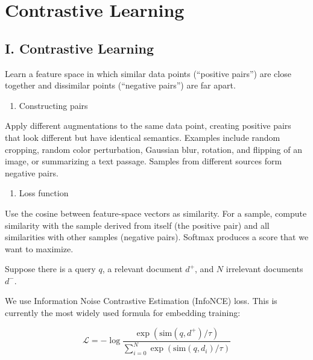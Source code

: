 \setcounter{section}{0}

\hypertarget{contrastive-learning}{%
\section{Contrastive Learning}\label{contrastive-learning}}

\hypertarget{i.-contrastive-learning}{%
\subsection{I. Contrastive Learning}\label{i.-contrastive-learning}}

Learn a feature space in which similar data points (``positive pairs'') are close together and dissimilar points (``negative pairs'') are far apart.

\begin{enumerate}
\def\labelenumi{\arabic{enumi}.}
\tightlist
\item
  Constructing pairs
\end{enumerate}

Apply different augmentations to the same data point, creating positive pairs that look different but have identical semantics. Examples include random cropping, random color perturbation, Gaussian blur, rotation, and flipping of an image, or summarizing a text passage. Samples from different sources form negative pairs.

\begin{enumerate}
\def\labelenumi{\arabic{enumi}.}
\setcounter{enumi}{1}
\tightlist
\item
  Loss function
\end{enumerate}

Use the cosine between feature-space vectors as similarity. For a sample, compute similarity with the sample derived from itself (the positive pair) and all similarities with other samples (negative pairs). Softmax produces a score that we want to maximize.

Suppose there is a query \(q\), a relevant document \(d^+\), and \(N\) irrelevant documents \(d^-\).

We use Information Noise Contrastive Estimation (InfoNCE) loss. This is currently the most widely used formula for embedding training:

\[
\mathcal{L} = -\log \frac{\exp(\mathrm{sim}(q,d^+)/\tau)}{\sum_{i=0}^{N}\exp(\mathrm{sim}(q,d_i)/\tau)}
\]


